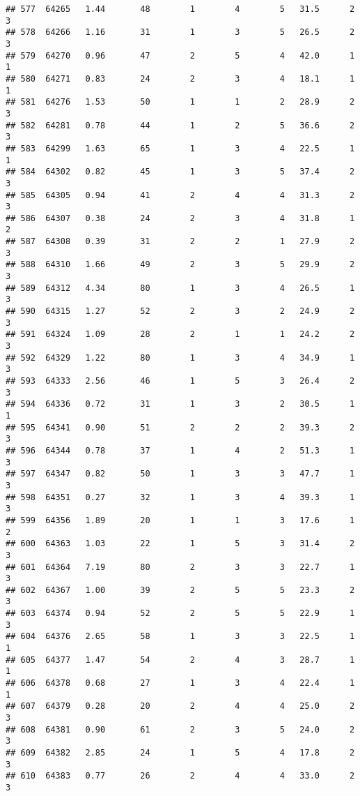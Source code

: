 \documentclass[
]{article}
\begin{document}
\begin{verbatim}
## 577  64265   1.44       48        1        4        5   31.5      2      3
## 578  64266   1.16       31        1        3        5   26.5      2      3
## 579  64270   0.96       47        2        5        4   42.0      1      1
## 580  64271   0.83       24        2        3        4   18.1      1      1
## 581  64276   1.53       50        1        1        2   28.9      2      3
## 582  64281   0.78       44        1        2        5   36.6      2      3
## 583  64299   1.63       65        1        3        4   22.5      1      1
## 584  64302   0.82       45        1        3        5   37.4      2      3
## 585  64305   0.94       41        2        4        4   31.3      2      3
## 586  64307   0.38       24        2        3        4   31.8      1      2
## 587  64308   0.39       31        2        2        1   27.9      2      3
## 588  64310   1.66       49        2        3        5   29.9      2      3
## 589  64312   4.34       80        1        3        4   26.5      1      3
## 590  64315   1.27       52        2        3        2   24.9      2      3
## 591  64324   1.09       28        2        1        1   24.2      2      3
## 592  64329   1.22       80        1        3        4   34.9      1      3
## 593  64333   2.56       46        1        5        3   26.4      2      3
## 594  64336   0.72       31        1        3        2   30.5      1      1
## 595  64341   0.90       51        2        2        2   39.3      2      3
## 596  64344   0.78       37        1        4        2   51.3      1      3
## 597  64347   0.82       50        1        3        3   47.7      1      3
## 598  64351   0.27       32        1        3        4   39.3      1      3
## 599  64356   1.89       20        1        1        3   17.6      1      2
## 600  64363   1.03       22        1        5        3   31.4      2      3
## 601  64364   7.19       80        2        3        3   22.7      1      3
## 602  64367   1.00       39        2        5        5   23.3      2      3
## 603  64374   0.94       52        2        5        5   22.9      1      3
## 604  64376   2.65       58        1        3        3   22.5      1      1
## 605  64377   1.47       54        2        4        3   28.7      1      1
## 606  64378   0.68       27        1        3        4   22.4      1      1
## 607  64379   0.28       20        2        4        4   25.0      2      3
## 608  64381   0.90       61        2        3        5   24.0      2      3
## 609  64382   2.85       24        1        5        4   17.8      2      3
## 610  64383   0.77       26        2        4        4   33.0      2      3

\end{verbatim}
\end{document}
